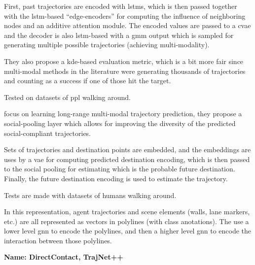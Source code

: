 First, past trajectories are encoded with \glspl{lstm}, which is then passed together with the \gls{lstm}-based ``edge-encoders'' for computing the influence of neighboring nodes and an additive attention module. 
%
The encoded values are passed to a \gls{cvae} and the decoder is also \gls{lstm}-based with a \gls{gmm} output which is sampled for generating multiple possible trajectories (achieving multi-modality).

They also propose a \gls{kde}-based evaluation metric, which is a bit more fair since multi-modal methods in the literature were generating thousands of trajectories and counting as a success if one of those hit the target.

Tested on datasets of ppl walking around.

\cite{mangalam2020not} focus on learning long-range multi-modal trajectory prediction, they propose a social-pooling layer which allows for improving the diversity of the predicted social-compliant trajectories.

Sets of trajectories and destination points are embedded, and the embeddings are uses by a \gls{vae} for computing predicted destination encoding, which is then passed to the social pooling for estimating which is the probable future destination.
%
Finally, the future destination encoding is used to estimate the trajectory.
%

Tests are made with datasets of humans walking around.


\cite{gao2020vectornet} In this representation, agent trajectories and scene elements (walls, lane markers, etc.) are all represented as vectors in polylines (with class anotations). The use a lower level gnn to encode the polylines, and then a higher level gnn to encode the interaction between those polylines. 



\textbf{Name: DirectContact, TrajNet++}




